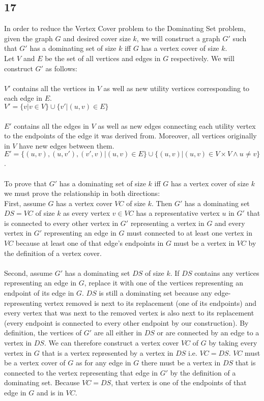 \documentclass[letterpaper,notitlepage,twoside]{article}
\newcommand{\union}{\cup}
\begin{document}
\subsection*{17}
In order to reduce the Vertex Cover problem to the Dominating Set problem, given the graph $G$ and desired cover size $k$, we will construct a graph $G'$ such that $G'$ has a dominating set of size $k$ iff $G$ has a vertex cover of size $k$. \\
Let $V$ and $E$ be the set of all vertices and edges in $G$ respectively. We will construct $G'$ as follows:
\\\\
$V'$ contains all the vertices in $V$ as well as new utility vertices corresponding to each edge in $E$. \\
$V' = \{v | v \in V\} \union \{ v' | (u, v) \in E\}$
\\\\
$E'$ contains all the edges in $V$ as well as new edges connecting each utility vertex to the endpoints of the edge it was derived from. Moreover, all vertices originally in $V$ have new edges between them.\\
$E' = \{(u, v), (u, v'), (v', v) | (u, v) \in E\} \union \{(u, v) | (u, v) \in V \times V \land u \neq v \}$.\\\\
To prove that $G'$ has a dominating set of size $k$ iff $G$ has a vertex cover of size $k$ we must prove the relationship in both directions: \\
First, assume $G$ has a vertex cover $VC$ of size $k$. Then $G'$ has a dominating set $DS = VC$ of size $k$ as every vertex $v \in VC$ has a representative vertex $u$ in $G'$ that is connected to every other vertex in $G'$ representing a vertex in $G$ and every vertex in $G'$ representing an edge in $G$ must connected to at least one vertex in $VC$ because at least one of that edge's endpoints in $G$ must be a vertex in $VC$ by the definition of a vertex cover. \\\\
Second, assume $G'$ has a dominating set $DS$ of size $k$. If $DS$ contains any vertices representing an edge in $G$, replace it with one of the vertices representing an endpoint of its edge in $G$. $DS$ is still a dominating set because any edge-representing vertex removed is next to its replacement (one of its endpoints) and every vertex that was next to the removed vertex is also next to its replacement (every endpoint is connected to every other endpoint by our construction). By definition, the vertices of $G'$ are all either in $DS$ or are connected by an edge to a vertex in $DS$. We can therefore construct a vertex cover $VC$ of $G$ by taking every vertex in $G$ that is a vertex represented by a vertex in $DS$ i.e. $VC = DS$. $VC$ must be a vertex cover of $G$ as for any edge in $G$ there must be a vertex in $DS$ that is connected to the vertex representing that edge in $G'$ by the definition of a dominating set. Because $VC = DS$, that vertex is one of the endpoints of that edge in $G$ and is in $VC$.
\end{document}
